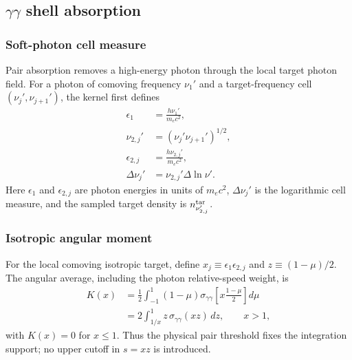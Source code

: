 \documentclass[twocolumn]{aastex702}
\begin{document}
\subsection{\texorpdfstring{\(\gamma\gamma\)}{gamma-gamma} shell absorption}

\subsubsection{Soft-photon cell measure}

Pair absorption removes a high-energy photon through the local target photon
field.  For a photon of comoving frequency \(\nu_1'\) and a target-frequency cell
\((\nu_j',\nu_{j+1}')\), the kernel first defines
\begin{equation}
\begin{aligned}
\epsilon_1&=\frac{h\nu_1'}{m_ec^2},\\
\nu_{2,j}'&=(\nu_j'\nu_{j+1}')^{1/2},\\
\epsilon_{2,j}&=\frac{h\nu_{2,j}'}{m_ec^2},\\
\Delta\nu_j'&=\nu_{2,j}'\Delta\ln\nu' .
\end{aligned}
\end{equation}
Here \(\epsilon_1\) and \(\epsilon_{2,j}\) are photon energies in units of
\(m_ec^2\), \(\Delta\nu_j'\) is the logarithmic cell measure, and the sampled
target density is \(n_{\nu_{2,j}'}^{\rm tar}\).

\subsubsection{Isotropic angular moment}

For the local comoving isotropic target, define
\(x_j\equiv\epsilon_1\epsilon_{2,j}\) and
\(z\equiv(1-\mu)/2\).  The angular average, including the photon relative-speed
weight, is
\begin{equation}
\begin{aligned}
K(x)&=\frac{1}{2}\int_{-1}^{1}(1-\mu)
\sigma_{\gamma\gamma}\!\left[x\frac{1-\mu}{2}\right]d\mu\\
&=2\int_{1/x}^{1}z\,\sigma_{\gamma\gamma}(xz)\,dz,
\qquad x>1,
\end{aligned}
\end{equation}
with \(K(x)=0\) for \(x\le1\).  Thus the physical pair threshold fixes the
integration support; no upper cutoff in \(s=xz\) is introduced.
\end{document}
